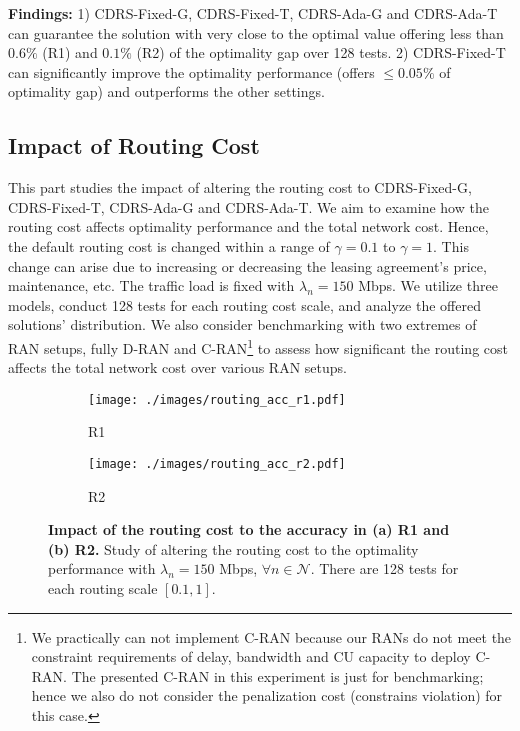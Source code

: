 \textbf{Findings:} 1) CDRS-Fixed-G, CDRS-Fixed-T, CDRS-Ada-G and CDRS-Ada-T can guarantee the solution with very close to the optimal value offering less than $0.6 \%$ (R1) and $0.1 \%$ (R2) of the optimality gap over 128 tests. 2) CDRS-Fixed-T can significantly improve the optimality performance (offers $\leq 0.05 \%$ of optimality gap) and outperforms the other settings.  



\vspace{-2mm}
\subsection{Impact of Routing Cost}
\vspace{-1mm}


This part studies the impact of altering the routing cost to CDRS-Fixed-G, CDRS-Fixed-T, CDRS-Ada-G and CDRS-Ada-T. We aim to examine how the routing cost affects optimality performance and the total network cost. Hence, the default routing cost is changed within a range of $\gamma=0.1$ to $\gamma=1$. This change can arise due to increasing or decreasing the leasing agreement's price, maintenance, etc. The traffic load is fixed with $\lambda_{n}=150$ Mbps. We utilize three  models, conduct 128 tests for each routing cost scale, and analyze the offered solutions' distribution. We also consider benchmarking with two extremes of RAN setups, fully D-RAN and C-RAN\footnote{We practically can not implement C-RAN because our RANs do not meet the constraint requirements of delay, bandwidth and CU capacity to deploy C-RAN. The presented C-RAN in this experiment is just for benchmarking; hence we also do not consider the penalization cost (constrains violation) for this case.} to assess how significant the routing cost affects the total network cost over various RAN setups.


\begin{figure*}[t] 
	\centering
	\begin{subfigure}[t]{.99\textwidth}
		\centering
		\texttt{[image: ./images/routing\_acc\_r1.pdf]}
		\small\caption{\small R1}
	\end{subfigure}
	\begin{subfigure}[t]{.99\textwidth}
		\centering
		\texttt{[image: ./images/routing\_acc\_r2.pdf]}
		\small\caption{\small R2}
	\end{subfigure}		
	\caption{\small \textbf{Impact of the routing cost to the accuracy in (a) R1 and (b) R2.} Study of altering the routing cost to the optimality performance with $\lambda_{n}=150$ Mbps, $\forall n \in \mathcal{N}$. There are 128 tests for each routing scale $[0.1,1]$.} \label{fig:routing_acc}
	\vspace{-3mm}
\end{figure*}


